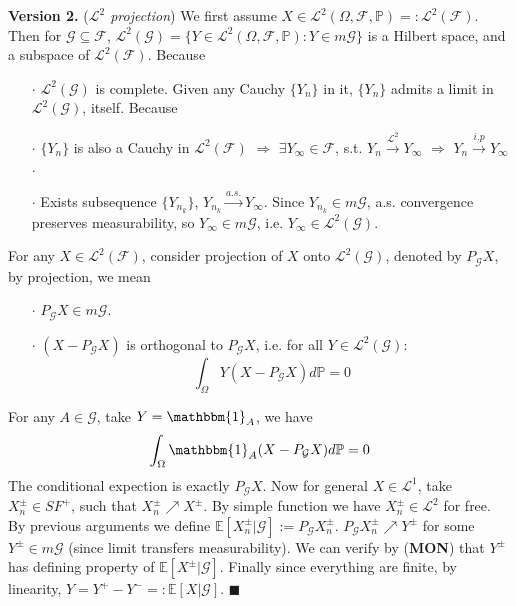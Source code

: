 \documentclass[a4paper,12pt,twoside]{book}
\begin{document}
\begin{itemize}
\begin{itemize}
		\textbf{Version 2.} (\textit{$\mathcal{L}^2$ projection}) We first assume $X \in \mathcal{L}^2(\Omega, \mathcal{F}, \mathbb{P})=:\mathcal{L}^2(\mathcal{F})$. Then for $\mathcal{G}\subseteq \mathcal{F}$, $\mathcal{L}^2(\mathcal{G})=\{Y\in \mathcal{L}^2 (\Omega, \mathcal{F}, \mathbb{P}): Y\in m \mathcal{G}\}$ is a Hilbert space, and a subspace of $\mathcal{L}^2(\mathcal{F})$. Because
		\begin{itemize}
			\item[$\cdot$] $\mathcal{L}^2(\mathcal{G})$ is complete. Given any Cauchy $\{Y_n\}$ in it, $\{Y_n\}$ admits a limit in $\mathcal{L}^2(\mathcal{G})$, itself. Because
			\item[$\cdot$] $\{Y_n\}$ is also a Cauchy in $\mathcal{L}^2(\mathcal{F})$ $\Rightarrow$ $\exists Y_{\infty}\in \mathcal{F}$, s.t. $Y_n \xrightarrow{\mathcal{L}^2} Y_{\infty}$ $\Rightarrow$ $Y_n \xrightarrow{i.p} Y_{\infty}$.
			\item[$\cdot$] Exists subsequence $\{Y_{n_k}\}$, $Y_{n_k} \xrightarrow{a.s.} Y_{\infty}$. Since $Y_{n_k} \in m \mathcal{G}$, a.s. convergence preserves measurability, so $Y_{\infty} \in m \mathcal{G}$, i.e. $Y_{\infty} \in \mathcal{L}^2(\mathcal{G})$.
 		\end{itemize}
 		For any $X \in \mathcal{L}^2(\mathcal{F})$, consider projection of $X$ onto $\mathcal{L}^2(\mathcal{G})$, denoted by $P_{\mathcal{G}}X$, by projection, we mean
 		\begin{itemize}
 			\item[$\cdot$] $P_{\mathcal{G}}X\in m \mathcal{G}$.
 			\item[$\cdot$] $(X-P_{\mathcal{G}}X)$ is orthogonal to $P_{\mathcal{G}}X$, i.e. for all $Y \in \mathcal{L}^2(\mathcal{G})$:
 			\begin{equation}
 				\int_{\Omega} Y(X-P_{\mathcal{G}}X) d\mathbb{P} =0
 			\end{equation}
 		\end{itemize}
 		For any $A\in \mathcal{G}$, take $Y=\mathbbm{1}_{A}$, we have
 		\begin{equation}
 			\int_{\Omega} \mathbbm{1}_{A}(X-P_{\mathcal{G}}X) d\mathbb{P} =0
 		\end{equation}
 		The conditional expection is exactly $P_{\mathcal{G}}X$. \newline
 		Now for general $X\in \mathcal{L}^1$, take $X_n^{\pm}\in SF^+$, such that $X_n^{\pm}\nearrow X^{\pm}$. By simple function we have $X_n^{\pm}\in \mathcal{L}^2$ for free. By previous arguments we define $\mathbb{E}\left[X_n^{\pm}|\mathcal{G}\right]:= P_{\mathcal{G}}X_n^{\pm}$. \newline
 		$P_{\mathcal{G}}X_n^{\pm} \nearrow Y^{\pm}$ for some $Y^{\pm}\in m \mathcal{G}$ (since limit transfers measurability). We can verify by (\textbf{MON}) that $Y^{\pm}$ has defining property of $\mathbb{E}\left[X^{\pm}|\mathcal{G}\right]$. \newline
 		Finally since everything are finite, by linearity, $Y=Y^{+}-Y^-=:\mathbb{E}\left[X|\mathcal{G}\right]$. $\blacksquare$


\end{itemize}
\end{itemize}
\end{document}
